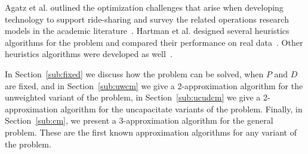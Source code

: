 Agatz et al. outlined the optimization challenges that arise 
when developing technology to support ride-sharing and survey the
related operations research models in the academic literature~\cite{agatz2012optimization}.  
Hartman et al. designed several heuristics algorithms for the 
\CARPOOL{} problem and compared 
their performance on real data~\cite{hartman2014theory}.
Other heuristics algorithms were developed as well~\cite{knapen2014exploiting}.

In Section~\ref{sub:fixed} we discuss how the problem can be solved,
when $P$ and $D$ are fixed,
and in Section~\ref{sub:uwcm} we give a 2-approximation algorithm for the
unweighted variant of the problem,
in Section~\ref{sub:ucudcm} we give a 2-approximation algorithm
for the uncapacitate variants of the problem. 
Finally, in Section~\ref{sub:cm}, we present a 3-approximation
algorithm for the general problem. 
These are the first known approximation algorithms for any variant of the problem.
